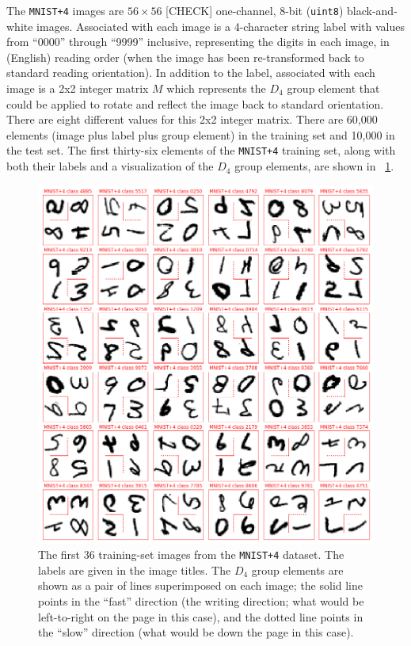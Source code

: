 \documentclass{article}
\newcommand{\figref}[1]{\figurename~\ref{#1}}
\begin{document}
The \texttt{MNIST+4} images are $56\times 56$ [CHECK] one-channel, 8-bit (\texttt{uint8}) black-and-white images.
Associated with each image is a 4-character string label with values from ``0000'' through ``9999'' inclusive, representing the digits in each image, in (English) reading order (when the image has been re-transformed back to standard reading orientation).
In addition to the label, associated with each image is a 2x2 integer matrix $M$ which represents the $D_4$ group element that could be applied to rotate and reflect the image back to standard orientation.
There are eight different values for this 2x2 integer matrix.
There are 60,000 elements (image plus label plus group element) in the training set and 10,000 in the test set.
The first thirty-six elements of the \texttt{MNIST+4} training set, along with both their labels and a visualization of the $D_4$ group elements, are shown in \figref{fig:4}.
\begin{figure}[t!]
\includegraphics[width=\textwidth]{../notebooks/MNIST+4.png}
\caption{The first 36 training-set images from the \texttt{MNIST+4} dataset. The labels are given in the image titles. The $D_4$ group elements are shown as a pair of lines superimposed on each image; the solid line points in the ``fast'' direction (the writing direction; what would be left-to-right on the page in this case), and the dotted line points in the ``slow'' direction (what would be down the page in this case).\label{fig:4}}
\end{figure}
\end{document}
